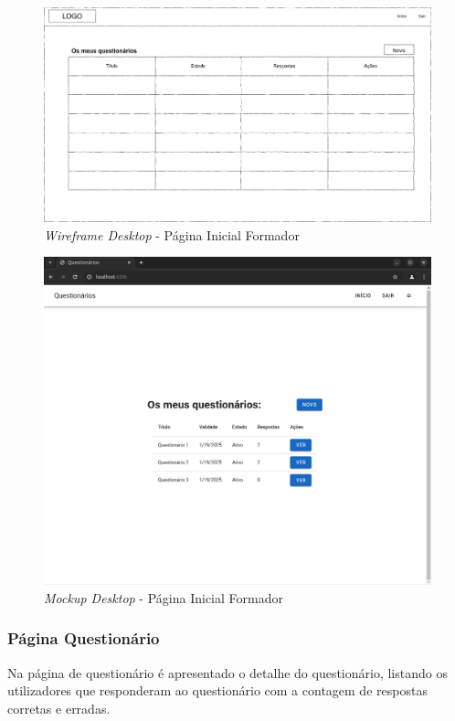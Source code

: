 \documentclass[12pt,a4paper,final]{article}
\begin{document}
    \begin{figure}[H]
        \centering
        \includegraphics[width=\textwidth,height=0.9\textheight,keepaspectratio]{wireframes/questionarios.wireframes-formador-geral-desktop.drawio}
        \caption{\textit{Wireframe Desktop} - Página Inicial Formador}
        \label{fig:wd-pif}
    \end{figure}

    \begin{figure}[H]
        \centering
        \includegraphics[width=\textwidth,height=0.9\textheight,keepaspectratio]{mockups/questionarios.wireframes-formador-geral-desktop}
        \caption{\textit{Mockup Desktop} - Página Inicial Formador}
        \label{fig:md-pif}
    \end{figure}

    \subsubsection{Página Questionário}
    Na página de questionário é apresentado o detalhe do questionário, listando os utilizadores que responderam ao questionário com a contagem de respostas corretas e erradas.
\end{document}
